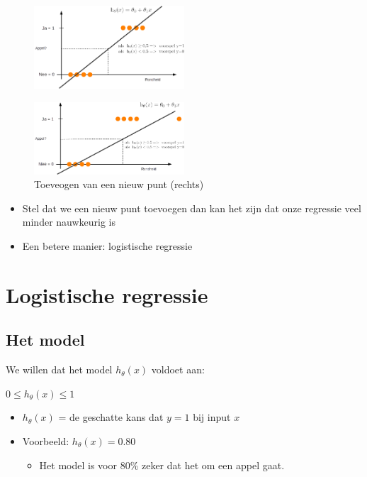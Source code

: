 \documentclass{article}
\begin{document}
\begin{figure}[H]
    \centering
    \includegraphics[width=0.5\textwidth]{classificatie-regressie2.png}
    \caption{}
\end{figure}

\begin{figure}[H]
    \centering
    \includegraphics[width=0.5\textwidth]{classificatie-regressie3.png}
    \caption{Toeveogen van een nieuw punt (rechts)}
\end{figure}

\begin{itemize}
    \item Stel dat we een nieuw punt toevoegen dan kan het zijn dat onze regressie veel minder nauwkeurig is
    \item Een betere manier: logistische regressie
\end{itemize}

\section{Logistische regressie}

\subsection{Het model}

We willen dat het model $h_{\theta}(x)$ voldoet aan:

\begin{center}
$0 \leq h_{\theta}(x) \leq 1$
\end{center}

\begin{itemize}
    \item $h_{\theta}(x)$ = de geschatte kans dat $y=1$ bij input $x$
    \item Voorbeeld: $h_{\theta}(x) = 0.80$
    \begin{itemize}
        \item Het model is voor 80\% zeker dat het om een appel gaat.
    \end{itemize}
\end{itemize}
\end{document}
